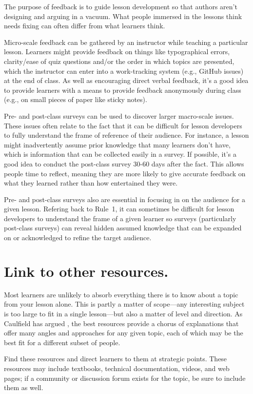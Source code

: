 \documentclass[10pt,letterpaper]{article}
\newcommand{\rulemajor}[1]{\section{#1}}
\begin{document}
The purpose of feedback is to guide lesson development
so that authors aren't designing and arguing in a vacuum.
What people immersed in the lessons think needs fixing
can often differ from what learners think.

Micro-scale feedback can be gathered by an instructor while teaching a particular lesson.
Learners might provide feedback on things like typographical errors,
clarity/ease of quiz questions and/or the order in which topics are presented,
which the instructor can enter into a work-tracking system (e.g., GitHub issues) at the end of class.
As well as encouraging direct verbal feedback,
it's a good idea to provide learners with a means to provide feedback anonymously during class 
(e.g., on small pieces of paper like sticky notes).

Pre- and post-class surveys can be used to discover larger macro-scale issues.
These issues often relate to the fact that it can be difficult for lesson developers
to fully understand the frame of reference of their audience.
For instance, a lesson might inadvertently assume prior knowledge that many learners don't have,
which is information that can be collected easily in a survey.
If possible, it's a good idea to conduct the post-class survey 30-60 days after the fact.
This allows people time to reflect,
meaning they are more likely to give accurate feedback on what they learned
rather than how entertained they were.

Pre- and post-class surveys also are essential in focusing in on the audience for a given lesson.
Refering back to Rule~1,
it can sometimes be difficult for lesson developers to understand the frame of a given learner
so surveys (particularly post-class surveys) can reveal hidden assumed knowledge
that can be expanded on or acknowledged to refine the target audience.

\rulemajor{Link to other resources.}

Most learners are unlikely to absorb everything there is to know about a topic
from your lesson alone.
This is partly a matter of scope---any interesting subject is too large
to fit in a single lesson---but also a matter of level and direction.
As Caulfield has argued \cite{choral-explanations},
the best resources provide a chorus of explanations
that offer many angles and approaches for any given topic,
each of which may be the best fit for a different subset of people.

Find these resources and direct learners to them at strategic points.
These resources may include textbooks,
technical documentation,
videos,
and web pages;
if a community or discussion forum exists for the topic,
be sure to include them as well.
\end{document}
